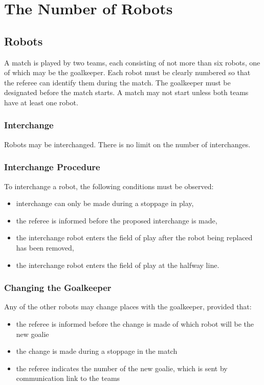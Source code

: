 \section{The Number of Robots}\label{sec:number-of-robots}

\subsection{Robots}
A match is played by two teams, each consisting of not more than six robots, one of which may be the goalkeeper.
Each robot must be clearly numbered so that the referee can identify them during the match.
The goalkeeper must be designated before the match starts.
A match may not start unless both teams have at least one robot.

\subsubsection{Interchange}\label{subsubsec:number-of-robots-interchange}
Robots may be interchanged.
There is no limit on the number of interchanges.

\subsubsection{Interchange Procedure}
To interchange a robot, the following conditions must be observed:
\begin{itemize}
\item interchange can only be made during a stoppage in play,
\item the referee is informed before the proposed interchange is made,
\item the interchange robot enters the field of play after the robot being replaced has been removed,
\item the interchange robot enters the field of play at the halfway line.
\end{itemize}

\subsubsection{Changing the Goalkeeper}
Any of the other robots may change places with the goalkeeper, provided that:
\begin{itemize}
\item the referee is informed before the change is made of which robot will be the new goalie
\item the change is made during a stoppage in the match
\item the referee indicates the number of the new goalie, which is sent by communication link to the teams
\end{itemize}

